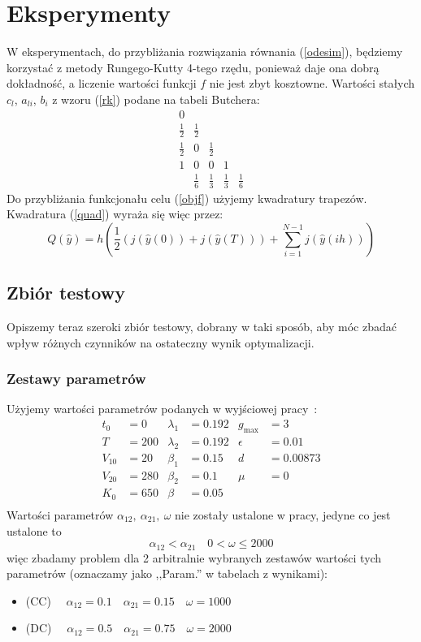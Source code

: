 \documentclass[11pt]{article}
\begin{document}
\section{Eksperymenty}
W eksperymentach, do przybliżania rozwiązania równania (\ref{odesim}), będziemy korzystać z metody Rungego-Kutty 4-tego rzędu, ponieważ daje ona dobrą dokładność, a liczenie wartości funkcji $f$ nie jest zbyt kosztowne. Wartości stałych $c_l$, $a_{li}$, $b_i$ z wzoru (\ref{rk}) podane na tabeli Butchera:
\begin{equation}\label{butcher}
  \begin{array}
    {c|cccc}
    0\\
    \frac{1}{2} & \frac{1}{2}\\
    \frac{1}{2} &0 &\frac{1}{2} \\
    1& 0& 0& 1\\
    \hline{}
    & \frac{1}{6} &\frac{1}{3} &\frac{1}{3} &\frac{1}{6} 
  \end{array}
\end{equation}
Do przybliżania funkcjonału celu (\ref{objf}) użyjemy kwadratury trapezów. Kwadratura (\ref{quad}) wyraża się więc przez:
\begin{equation} \label{trapezoidal}
  Q(\hat{y}) = h\left(\frac{1}{2}(j(\hat{y}(0)) + j(\hat{y}(T))) + \sum_{i=1}^{N-1} j(\hat{y}(ih))\right)
\end{equation}

\subsection{Zbiór testowy}
Opiszemy teraz szeroki zbiór testowy, dobrany w taki sposób, aby móc zbadać wpływ różnych czynników na ostateczny wynik optymalizacji.
\subsubsection{Zestawy parametrów}
Użyjemy wartości parametrów podanych w wyjściowej pracy~\cite{BBF-manuscript}:
\begin{align*}
  t_0 &= 0          & \lambda_1 &= 0.192 & g_{\max} &= 3    \\
  T &= 200          & \lambda_2 &= 0.192 & \epsilon &= 0.01 \\
  V_{10} &= 20      & \beta_1 &= 0.15    & d &= 0.00873     \\
  V_{20} &= 280     & \beta_2 &= 0.1     & \mu &= 0         \\
  K_0 &= 650        & \beta &= 0.05      &       &          \\
\end{align*}
Wartości parametrów $\alpha_{12},\ \alpha_{21},\ \omega$ nie zostały ustalone w pracy, jedyne co jest ustalone to
\[ \alpha_{12} < \alpha_{21}\quad 0 < \omega \le 2000 \]
więc zbadamy problem dla 2 arbitralnie wybranych zestawów wartości tych parametrów (oznaczamy jako ,,Param.'' w tabelach z wynikami):
\begin{itemize}
\item{(CC)} $\quad \alpha_{12} = 0.1 \quad \alpha_{21} = 0.15 \quad \omega = 1000$
\item{(DC)} $\quad \alpha_{12} = 0.5 \quad \alpha_{21} = 0.75 \quad \omega = 2000$ 
\end{itemize}
\end{document}
